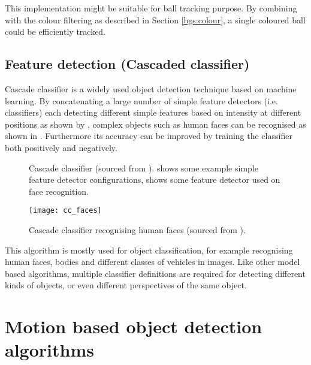 This implementation might be suitable for ball tracking purpose. By combining with the colour filtering as described in Section \ref{bgs:colour}, a single coloured ball could be efficiently tracked.

\subsection{Feature detection (Cascaded classifier)}
\label{sec:bg:cc}


Cascade classifier \cite{cascade} \cite{viola2001rapid} is a widely used object detection technique based on machine learning. By concatenating a large number of simple feature detectors (i.e. classifiers) each detecting different simple features based on intensity at different positions as shown by , complex objects such as human faces can be recognised as shown in . Furthermore its accuracy can be improved by training the classifier both positively and negatively.

\begin{figure}[H]
  \centering
  \caption{Cascade classifier (sourced from \cite{borovicka2003circle}).  shows some example simple feature detector configurations,  shows some feature detector used on face recognition.}
  \label{bg:cc}
\end{figure}

\begin{figure}[H]
  \centering
  \texttt{[image: cc\_faces]}
  \caption{Cascade classifier recognising human faces (sourced from \cite{borovicka2003circle}).}
  \label{cc:faces}
\end{figure}

This algorithm is mostly used for object classification, for example recognising human faces, bodies and different classes of vehicles in images. Like other model based algorithms, multiple classifier definitions are required for detecting different kinds of objects, or even different perspectives of the same object.


\section{Motion based object detection algorithms}

